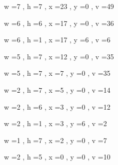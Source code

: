 \documentclass[11pt]{article}
\begin{document}
w =7 , h =7 , x =23 , y =0 , v =49
\par
w =6 , h =6 , x =17 , y =0 , v =36
\par
w =6 , h =1 , x =17 , y =6 , v =6
\par
w =5 , h =7 , x =12 , y =0 , v =35
\par
w =5 , h =7 , x =7 , y =0 , v =35
\par
w =2 , h =7 , x =5 , y =0 , v =14
\par
w =2 , h =6 , x =3 , y =0 , v =12
\par
w =2 , h =1 , x =3 , y =6 , v =2
\par
w =1 , h =7 , x =2 , y =0 , v =7
\par
w =2 , h =5 , x =0 , y =0 , v =10
\par
\newpage
\end{document}
